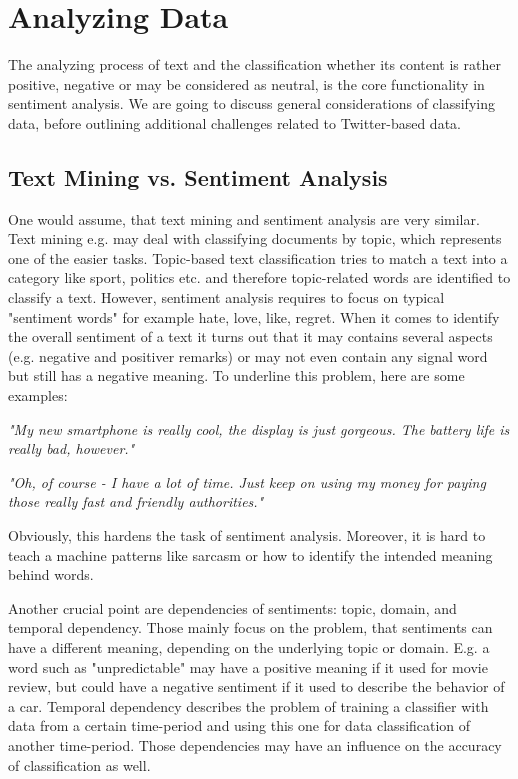 \documentclass{acm_proc_article-sp}
\begin{document}
\section{Analyzing Data} \label{analyzingdata} The analyzing process of text
and the classification whether its content is rather positive, negative or may
be considered as neutral, is the core functionality in sentiment analysis. We
are going to discuss general considerations of classifying data,
before outlining additional challenges related to Twitter-based data.

\subsection{Text Mining vs. Sentiment Analysis} One would assume, that text
mining and sentiment analysis are very similar. Text mining e.g. may deal with
classifying documents by topic, which represents one of the easier tasks.
Topic-based text classification tries to match a text into a category like
sport, politics etc. and therefore topic-related words are identified to
classify a text. However, sentiment analysis requires to focus on typical
"sentiment words" for example hate, love, like, regret.  When it comes to
identify the overall sentiment of a text it turns out that it may contains
several aspects (e.g. negative and positiver remarks) or may not even contain
any signal word but still has a negative
meaning.  To underline this problem, here are some examples:

\textit{"My new smartphone is really cool, the display is just gorgeous. The
battery life is really bad, however."}

\textsl{"Oh, of course - I have a lot of time. Just keep on using my money for
paying those really fast and friendly authorities."}

Obviously, this hardens the task of sentiment analysis. Moreover, it is hard to
teach a machine patterns like sarcasm or how to identify the intended meaning
behind words.  \cite{liu2010sentimentanalysis,pang2008opinion}


Another crucial point are dependencies of sentiments: topic, domain, and
temporal dependency. Those mainly focus on the problem, that sentiments can
have a different meaning, depending on the underlying topic or domain. E.g. a
word such as "unpredictable" may have a positive meaning if it used for movie
review, but could have a negative sentiment if it used to describe the behavior
of a car. Temporal dependency describes the problem of training a classifier with data from a
certain time-period and using this one for data classification of another time-period.
Those dependencies may have an influence on the accuracy of classification as well.
\cite{read2005using,pang2008opinion}
\end{document}
